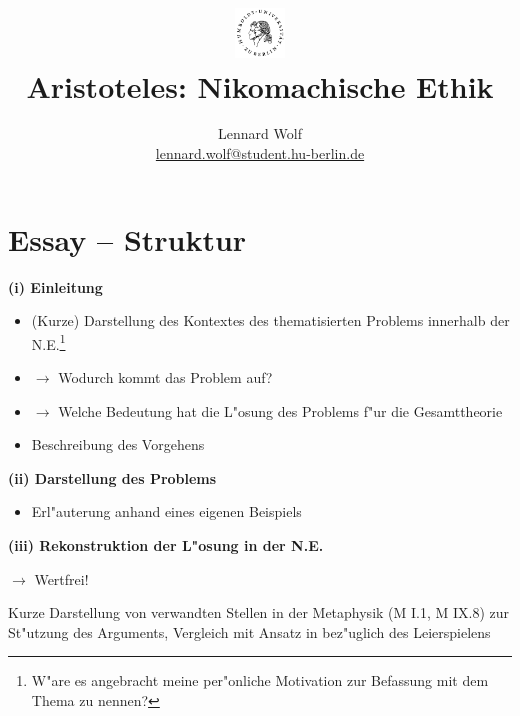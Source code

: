 \documentclass[a4paper]{article}
\date{\vspace{-3ex}}
\begin{document}
\title{
    \vspace{-30pt}
	\includegraphics*[width=0.1\textwidth,right]{ErstesSem/images/hu_logo2.png}\\
	\vspace{-10pt}
	Aristoteles: Nikomachische Ethik}
\author{Lennard Wolf\\
        \small{\href{mailto:lennard.wolf@student.hu-berlin.de}{lennard.wolf@student.hu-berlin.de}}}
\maketitle
\vspace{-4pt}

\section*{Essay -- Struktur}
\large

\textbf{(i) Einleitung} 

\begin{itemize}
  \item (Kurze) Darstellung des Kontextes des thematisierten Problems innerhalb der N.E.\footnote{W"are es angebracht meine per"onliche Motivation zur Befassung mit dem Thema zu nennen?}
  \item $\rightarrow$ Wodurch kommt das Problem auf?
  \item $\rightarrow$ Welche Bedeutung hat die L"osung des Problems f"ur die Gesamttheorie
  \item Beschreibung des Vorgehens
\end{itemize}

\noindent \textbf{(ii) Darstellung des Problems}

\begin{itemize}
  \item Erl"auterung anhand eines eigenen Beispiels
\end{itemize}


\noindent \textbf{(iii) Rekonstruktion der L"osung in der N.E.}

$\rightarrow$ Wertfrei!

Kurze Darstellung von verwandten Stellen in der Metaphysik (M I.1, M IX.8) zur St"utzung des Arguments, Vergleich mit Ansatz in bez"uglich des Leierspielens\newline
\end{document}
